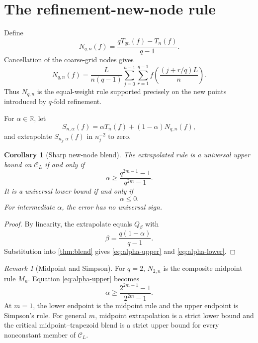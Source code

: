 \documentclass[11pt]{article}
\newtheorem{corollary}[theorem]{Corollary}
\theoremstyle{definition}
\theoremstyle{remark}
\newtheorem{remark}[theorem]{Remark}
\newcommand{\R}{\mathbb{R}}
\newcommand{\cC}{\mathcal{C}}
\newcommand{\1}{\mathbf{1}}
\begin{document}
\section{The refinement-new-node rule}

Define
\begin{equation}
N_{q,n}(f)
=\frac{qT_{qn}(f)-T_n(f)}{q-1}.
\label{eq:new-node}
\end{equation}
Cancellation of the coarse-grid nodes gives
\begin{equation}
N_{q,n}(f)
=
\frac{L}{n(q-1)}
\sum_{j=0}^{n-1}\sum_{r=1}^{q-1}
f\left(\frac{(j+r/q)L}{n}\right).
\label{eq:new-node-explicit}
\end{equation}
Thus \(N_{q,n}\) is the equal-weight rule supported precisely on the new
points introduced by \(q\)-fold refinement.

For \(\alpha\in\R\), let
\[
S_{n,\alpha}(f)
=\alpha T_n(f)+(1-\alpha)N_{q,n}(f),
\]
and extrapolate \(S_{n_j,\alpha}(f)\) in \(n_j^{-2}\) to zero.

\begin{corollary}[Sharp new-node blend]
\label{cor:new-node}
The extrapolated rule is a universal upper bound on \(\cC_L\) if and only if
\begin{equation}
\boxed{
\alpha\ge\frac{q^{2m-1}-1}{q^{2m}-1}.}
\label{eq:alpha-upper}
\end{equation}
It is a universal lower bound if and only if
\begin{equation}
\boxed{\alpha\le0.}
\label{eq:alpha-lower}
\end{equation}
For intermediate \(\alpha\), the error has no universal sign.
\end{corollary}

\begin{proof}
By linearity, the extrapolate equals \(Q_\beta\) with
\[
\beta=\frac{q(1-\alpha)}{q-1}.
\]
Substitution into \cref{thm:blend} gives
\eqref{eq:alpha-upper} and \eqref{eq:alpha-lower}.
\end{proof}

\begin{remark}[Midpoint and Simpson]
For \(q=2\), \(N_{2,n}\) is the composite midpoint rule \(M_n\).
Equation \eqref{eq:alpha-upper} becomes
\[
\alpha\ge
\frac{2^{2m-1}-1}{2^{2m}-1}.
\]
At \(m=1\), the lower endpoint is the midpoint rule and the upper endpoint is
Simpson's rule. For general \(m\), midpoint extrapolation is a strict lower
bound and the critical midpoint--trapezoid blend is a strict upper bound for
every nonconstant member of \(\cC_L\).
\end{remark}
\end{document}
